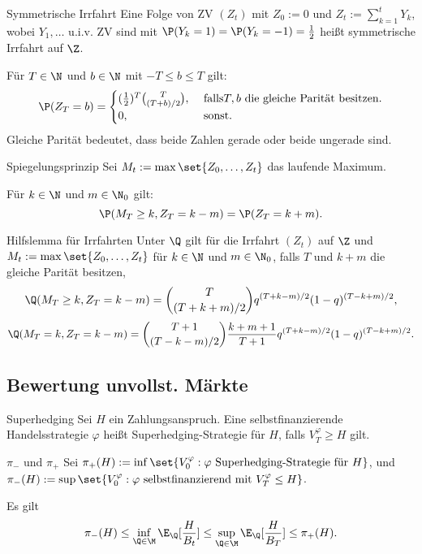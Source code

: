 \begin{karte}{Symmetrische Irrfahrt}
Eine Folge von ZV \((Z_t)\) mit \(Z_0 := 0\) und \(Z_t := \sum_{k=1}^t Y_k\), 
wobei \(Y_1, \ldots\) u.i.v. ZV sind mit \(\P(Y_k = 1) = \P(Y_k = -1) = \frac{1}{2}\) heißt symmetrische Irrfahrt auf \(\Z\).

Für \(T\in \N\) und \(b\in\N\) mit \(-T\leq b\leq T\) gilt: 
\[ \P(Z_T = b) = \begin{cases}
    (\frac{1}{2})^T \binom{T}{(T+b)/2}, &\text{ falls} T, b \text{ die gleiche Parität besitzen.} \\
    0, & \text{ sonst}.
\end{cases} \]
Gleiche Parität bedeutet, dass beide Zahlen gerade oder beide ungerade sind.
\end{karte}

\begin{karte}{Spiegelungsprinzip}
Sei \(M_t := \max\set{ Z_0, \ldots, Z_t }\) das laufende Maximum. 

Für \(k\in\N\) und \(m\in\N_0\) gilt: 
\[ \P(M_T\geq k, Z_T = k-m) = \P(Z_T = k+m). \]
\end{karte}

\begin{karte}{Hilfslemma für Irrfahrten}
Unter \(\Q\) gilt für die Irrfahrt \((Z_t)\) auf \(\Z\) und \(M_t := \max\set{Z_0,\ldots, Z_t}\) 
für \(k\in\N\) und \(m\in\N_0\), falls \(T\) und \(k+m\) die gleiche Parität besitzen, 
\[ \Q(M_T \geq k, Z_T = k-m) = \binom{T}{(T+k+m)/2} q^{(T+k-m)/2} (1-q)^{(T-k+m)/2}, \]
\[ \Q(M_T = k, Z_T = k-m) = \binom{T+1}{(T-k-m)/2} \frac{k+m+1}{T+1} q^{(T+k-m)/2} (1-q)^{(T-k+m)/2}. \]
\end{karte}

\subsection{Bewertung unvollst. Märkte}

\begin{karte}{Superhedging}
Sei \(H\) ein Zahlungsanspruch. Eine selbstfinanzierende Handelsstrategie 
\(\varphi\) heißt Superhedging-Strategie für \(H\), falls \(V_T^\varphi \geq H\) gilt.
\end{karte}

\begin{karte}{\(\pi_-\) und \(\pi_+\)}
Sei \(\pi_+(H) := \inf \set{V_0^\varphi: \varphi \text{ Superhedging-Strategie für } H}\), 
und \(\pi_-(H) := \sup \set{ V_0^\varphi: \varphi \text{ selbstfinanzierend mit } V_T^\varphi \leq H }\).

Es gilt 
\[ \pi_-(H) \leq \inf_{\Q\in\M} \E_\Q[\frac{H}{B_t}] \leq \sup_{\Q\in\M} \E_\Q [\frac{H}{B_T}] 
\leq \pi_+(H). \]
\end{karte}

